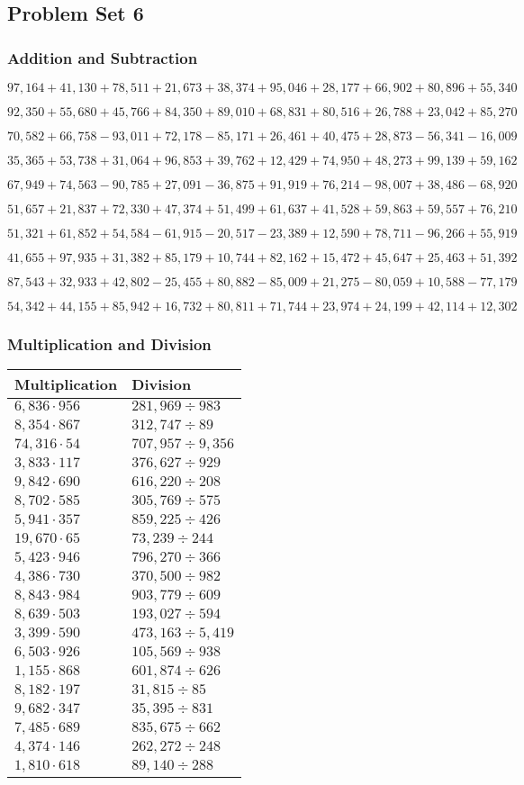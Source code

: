 \hypertarget{problem-set-6-4}{%
\subsection{Problem Set 6}\label{problem-set-6-4}}

\hypertarget{addition-and-subtraction-228}{%
\subsubsection{Addition and
Subtraction}\label{addition-and-subtraction-228}}

\(97,164+41,130+78,511+21,673+38,374+95,046+28,177+66,902+80,896+ 55,340\)

\(92,350+55,680+45,766+84,350+89,010+68,831+80,516+26,788+23,042+85,270\)

\(70,582+66,758-93,011+72,178-85,171+26,461+40,475+28,873-56,341-16,009\)

\(35,365+53,738+31,064+96,853+39,762+12,429+74,950+48,273+99,139+59,162\)

\(67,949+74,563-90,785+27,091-36,875+91,919+76,214-98,007+38,486-68,920\)

\(51,657+21,837+72,330+47,374+51,499+61,637+41,528+59,863+59,557+76,210\)

\(51,321+61,852+54,584-61,915-20,517-23,389+12,590+78,711-96,266+55,919\)

\(41,655+97,935+31,382+85,179+10,744+82,162+15,472+45,647+25,463+51,392\)

\(87,543+32,933+42,802-25,455+80,882-85,009+21,275-80,059+10,588-77,179\)

\(54,342+44,155+85,942+16,732+80,811+71,744+23,974+24,199+42,114+12,302\)

\hypertarget{multiplication-and-division-227}{%
\subsubsection{Multiplication and
Division}\label{multiplication-and-division-227}}

\begin{longtable}[]{@{}ll@{}}
\toprule
Multiplication & Division\tabularnewline
\midrule
\endhead
\(6,836\cdot956\) & \(281,969÷983\)\tabularnewline
\(8,354\cdot867\) & \(312,747 ÷89\)\tabularnewline
\(74,316\cdot54\) & \(707,957÷9,356\)\tabularnewline
\(3,833\cdot117\) & \(376,627÷929\)\tabularnewline
\(9,842\cdot690\) & \(616,220÷208\)\tabularnewline
\(8,702\cdot585\) & \(305,769÷575\)\tabularnewline
\(5,941\cdot357\) & \(859,225÷426\)\tabularnewline
\(19,670\cdot65\) & \(73,239÷244\)\tabularnewline
\(5,423\cdot946\) & \(796,270÷366\)\tabularnewline
\(4,386\cdot730\) & \(370,500÷982\)\tabularnewline
\(8,843\cdot984\) & \(903,779÷609\)\tabularnewline
\(8,639\cdot503\) & \(193,027÷594\)\tabularnewline
\(3,399\cdot590\) & \(473,163÷5,419\)\tabularnewline
\(6,503\cdot926\) & \(105,569÷938\)\tabularnewline
\(1,155\cdot868\) & \(601,874÷626\)\tabularnewline
\(8,182\cdot197\) & \(31,815÷85\)\tabularnewline
\(9,682\cdot347\) & \(35,395÷831\)\tabularnewline
\(7,485\cdot689\) & \(835,675÷662\)\tabularnewline
\(4,374\cdot146\) & \(262,272÷248\)\tabularnewline
\(1,810\cdot618\) & \(89,140÷288\)\tabularnewline
\bottomrule
\end{longtable}

